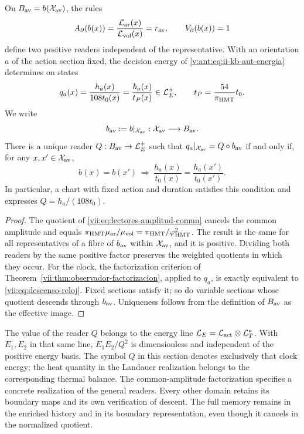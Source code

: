 \begin{proposition}
\label{vii:prop:lectores-frontera-explicitos}
On \(B_{\rm av}=b(\mathcal X_{\rm av})\), the rules
\begin{equation}
 A_\partial(b(x))
 =\frac{\mathcal L_{\rm ar}(x)}{\mathcal L_{\rm vol}(x)}
 =r_{\rm av},\qquad V_\partial(b(x))=1
 \label{vii:eq:lectores-normalizados}
\end{equation}
define two positive readers independent of the representative.
With an orientation \(a\) of the action section fixed, the decision
energy of \eqref{v:ant:eq:ii-kb-aut-energia} determines on states
\begin{equation}
 q_a(x)=\frac{h_a(x)}{108t_0(x)}
       =\frac{\hbar_a(x)}{t_P(x)}\in\mathcal L_E^+,
 \qquad t_P=\frac{54}{\pi_{\rm HMT}}t_0.
 \label{vii:eq:lector-q-accion}
\end{equation}
We write
\[
 b_{\rm av}:=b|_{\mathcal X_{\rm av}}:
 \mathcal X_{\rm av}\longrightarrow B_{\rm av}.
\]
There is a unique reader \(Q:B_{\rm av}\to\mathcal L_E^+\) such that
\(q_a|_{\mathcal X_{\rm av}}=Q\circ b_{\rm av}\)
if and only if, for any \(x,x'\in\mathcal X_{\rm av}\),
\begin{equation}
 b(x)=b(x')\ \Longrightarrow\
 \frac{h_a(x)}{t_0(x)}=\frac{h_a(x')}{t_0(x')}.
 \label{vii:eq:descenso-reloj}
\end{equation}
In particular, a chart with fixed action and duration satisfies this
condition and expresses \(Q=h_a/(108t_0)\).
\end{proposition}
\begin{proof}
The quotient of \eqref{vii:eq:lectores-amplitud-comun} cancels the
common amplitude and equals
\(\pi_{\rm HMT}\mu_{\rm ar}/\mu_{\rm vol}
=\pi_{\rm HMT}/\varphi_{\rm HMT}^2\).
The result is the same for all representatives of a fibre
of \(b_{\rm av}\) within \(\mathcal X_{\rm av}\), and it is positive.
Dividing both readers by the same positive factor
preserves the weighted quotients in which they occur.
For the clock, the factorization criterion of
Theorem~\ref{vii:thm:observador-factorizacion}, applied to \(q_a\),
is exactly equivalent to \eqref{vii:eq:descenso-reloj}. Fixed sections
satisfy it; so do variable sections whose
quotient descends through \(b_{\rm av}\). Uniqueness follows from the definition
of \(B_{\rm av}\) as the effective image.
\end{proof}

The value of the reader \(Q\) belongs to the energy line
\(\mathcal L_E=\mathcal L_{\rm act}\otimes\mathcal L_T^*\).
With \(E_1,E_2\) in that same line,
\(E_1E_2/Q^2\) is dimensionless and independent of the positive
energy basis. The symbol \(Q\) in this section denotes exclusively
that clock energy; the heat quantity in the Landauer
realization belongs to the corresponding thermal balance.
The common-amplitude factorization specifies a concrete
realization of the general readers. Every other domain retains its
boundary maps and its own verification of descent.
The full memory remains in the enriched history and in its
boundary representation, even though it cancels in the normalized quotient.


